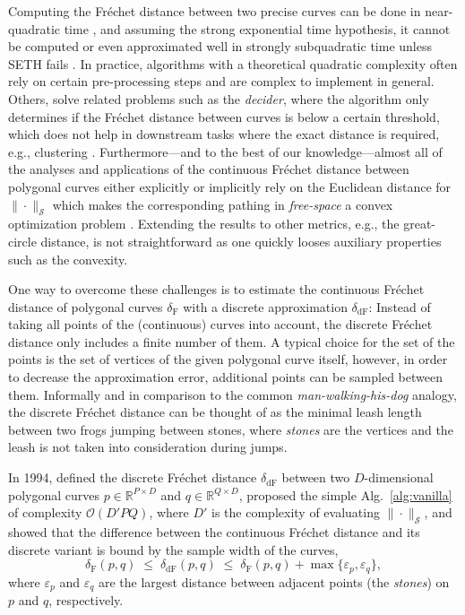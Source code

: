 Computing the Fr\'echet distance between two precise curves can be done in near-quadratic time \citep{agarwal14,alt95,buchin17a}, and assuming the strong exponential time hypothesis, it cannot be computed or even approximated well in strongly subquadratic time unless SETH fails \citep{bringmann14,buchin19a}.
In practice, algorithms with a theoretical quadratic complexity often rely on certain pre-processing steps and are complex to implement in general.
Others, solve related problems such as the \textit{decider}, where the algorithm only determines if the Fr\'echet distance between curves is below a certain threshold, which does not help in downstream tasks where the exact distance is required, e.g., clustering \citep{bringmann19}.
Furthermore---and to the best of our knowledge---almost all of the analyses and applications of the continuous Fr\'echet distance between polygonal curves either explicitly or implicitly rely on the Euclidean distance for $\| \cdot \|_\mathcal{S}$ which makes the corresponding pathing in \textit{free-space} a convex optimization problem \citep{alt92,alt95}.
Extending the results to other metrics, e.g., the great-circle distance, is not straightforward as one quickly looses auxiliary properties such as the convexity.

One way to overcome these challenges is to estimate the continuous Fr\'echet distance of polygonal curves $\delta_\mathrm{F}$ with a discrete approximation $\delta_\mathrm{dF}$:
Instead of taking all points of the (continuous) curves into account, the discrete Fr\'echet distance only includes a finite number of them.
A typical choice for the set of the points is the set of vertices of the given polygonal curve itself, however, in order to decrease the approximation error, additional points can be sampled between them.
Informally and in comparison to the common \textit{man-walking-his-dog} analogy, the discrete Fr\'echet distance can be thought of as the minimal leash length between two frogs jumping between stones, where \textit{stones} are the vertices and the leash is not taken into consideration during jumps.

In 1994, \citet{eiter94} defined the discrete Fr\'echet distance $\delta_\mathrm{dF}$ between two $D$-dimensional polygonal curves $p \in \mathbb{R}^{P \times D}$ and $q \in \mathbb{R}^{Q \times D}$, proposed the simple Alg.~\ref{alg:vanilla} of complexity $\mathcal{O}(D'PQ)$, where $D'$ is the complexity of evaluating $\| \cdot \|_\mathcal{S}$, and showed that the difference between the continuous Fr\'echet distance and its discrete variant is bound by the sample width of the curves,
\begin{equation*}
    \delta_\mathrm{F}(p, q) \;\le\; \delta_\mathrm{dF}(p, q) \;\le\; \delta_\mathrm{F}(p, q) + \max\{ \varepsilon_p, \varepsilon_q \},
\end{equation*}
where $\varepsilon_p$ and $\varepsilon_q$ are the largest distance between adjacent points (the \textit{stones}) on $p$ and $q$, respectively.

